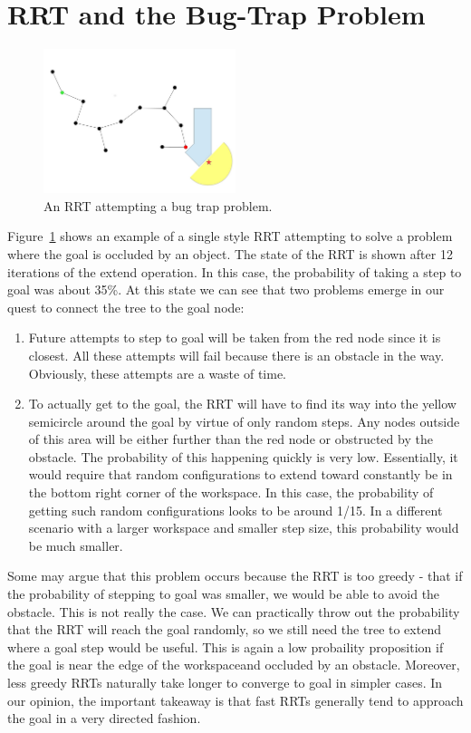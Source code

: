 \documentclass[conference]{IEEEtran}
\begin{document}
\section{RRT and the Bug-Trap Problem}
\label{sec:bugtraprrt}

\begin{figure}[h!]
  \centering
    \includegraphics[width=0.5\textwidth]{figures/bugTrapRRT.jpg}
  \caption{An RRT attempting a bug trap problem. \label{fig:BugTrapRRT} }
\end{figure}

Figure~\ref{fig:BugTrapRRT} shows an example of a single style RRT attempting to solve a problem where the goal is occluded by an object.
The state of the RRT is shown after 12 iterations of the extend operation. In this case, the probability of taking a step to goal was about
35\%. At this state we can see that two problems emerge in our quest to connect the tree to the goal node:
\begin{enumerate}
\item Future attempts to step to goal will be taken from the red node since it is closest. All these attempts will fail because there is an
obstacle in the way. Obviously, these attempts are a waste of time.
\item To actually get to the goal, the RRT will have to find its way into the yellow semicircle around the goal by virtue of only random
steps. Any nodes outside of this area will be either further than the red node or obstructed by the obstacle. The probability of this
happening quickly is very low. Essentially, it would require that random configurations to extend toward constantly be in the bottom right
corner of the workspace. In this case, the probability of getting such random configurations looks to be around 1/15. In a different
scenario with a larger workspace and smaller step size, this probability would be much smaller. 
\end{enumerate}

Some may argue that this problem occurs because the RRT is too greedy - that if the probability of stepping to goal was smaller, we would be
able to avoid the obstacle. This is not really the case. We can practically throw out the probability that the RRT will reach the goal
randomly, so we still need the tree to extend where a goal step would be useful. This is again a low probaility proposition if the goal is
near the edge of the workspaceand occluded by an obstacle. Moreover, less greedy RRTs naturally take longer to converge to goal in simpler
cases. In our opinion, the important takeaway is that fast RRTs generally tend to approach the goal in a very directed fashion.
\end{document}
